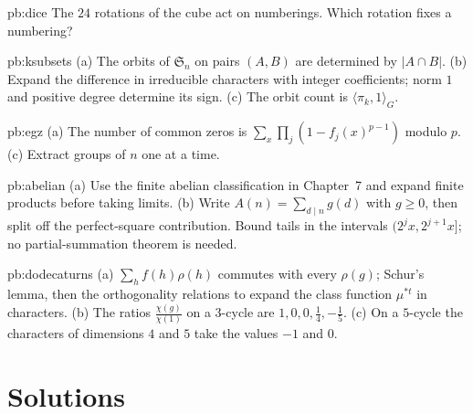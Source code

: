 \begin{hint}{pb:dice}
The $24$ rotations of the cube act on numberings. Which rotation fixes a numbering?
\end{hint}

\begin{hint}{pb:ksubsets}
(a) The orbits of $\mathfrak S_n$ on pairs $(A,B)$ are determined by $|A\cap B|$. (b) Expand the difference in irreducible characters with integer coefficients; norm $1$ and positive degree determine its sign. (c) The orbit count is $\langle\pi_k,1\rangle_G$.
\end{hint}

\begin{hint}{pb:egz}
(a) The number of common zeros is $\sum_x\prod_j(1-f_j(x)^{p-1})$ modulo $p$. (c) Extract groups of $n$ one at a time.
\end{hint}

\begin{hint}{pb:abelian}
(a) Use the finite abelian classification in Chapter~7 and expand finite products before taking limits. (b) Write $A(n)=\sum_{d\mid n}g(d)$ with $g\ge0$, then split off the perfect-square contribution. Bound tails in the intervals $(2^jx,2^{j+1}x]$; no partial-summation theorem is needed.
\end{hint}

\begin{hint}{pb:dodecaturns}
(a) $\sum_hf(h)\rho(h)$ commutes with every $\rho(g)$; Schur's lemma, then the orthogonality relations to expand the class function $\mu^{*t}$ in
characters. (b) The ratios $\frac{\chi(g)}{\chi(1)}$ on a $3$-cycle are $1,0,0,\frac14,-\frac15$. (c) On a $5$-cycle the characters of dimensions $4$ and $5$ take the values
$-1$ and $0$.
\end{hint}

\section{Solutions}

